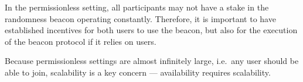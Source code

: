In the permissionless setting, all participants may not have a stake in the randomness beacon operating constantly.
Therefore, it is important to have established incentives for both users to use the beacon, but also for the execution of the beacon protocol if it relies on users.

Because permissionless settings are almost infinitely large, i.e.\ any user should be able to join, scalability is a key concern --- availability requires scalability.
